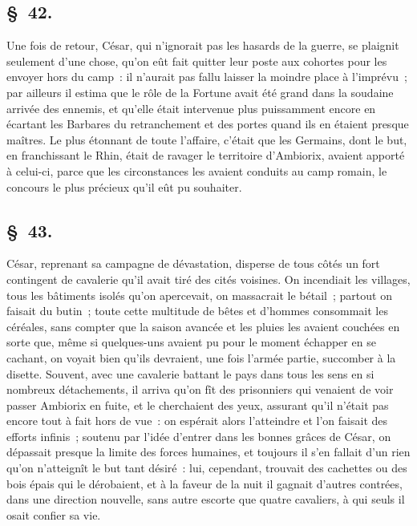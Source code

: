 \documentclass[french,twoside]{book} %
\begin{document}
\subsection[{§ 42.}]{ \textsc{§ 42.} }
\noindent Une fois de retour, César, qui n’ignorait pas les hasards de la guerre, se plaignit seulement d’une chose, qu’on eût fait quitter leur poste aux cohortes pour les envoyer hors du camp : il n’aurait pas fallu laisser la moindre place à l’imprévu ; par ailleurs il estima que le rôle de la Fortune avait été grand dans la soudaine arrivée des ennemis, et qu’elle était intervenue plus puissamment encore en écartant les Barbares du retranchement et des portes quand ils en étaient presque maîtres. Le plus étonnant de toute l’affaire, c’était que les Germains, dont le but, en franchissant le Rhin, était de ravager le territoire d’Ambiorix, avaient apporté à celui-ci, parce que les circonstances les avaient conduits au camp romain, le concours le plus précieux qu’il eût pu souhaiter.
\subsection[{§ 43.}]{ \textsc{§ 43.} }
\noindent César, reprenant sa campagne de dévastation, disperse de tous côtés un fort contingent de cavalerie qu’il avait tiré des cités voisines. On incendiait les villages, tous les bâtiments isolés qu’on apercevait, on massacrait le bétail ; partout on faisait du butin ; toute cette multitude de bêtes et d’hommes consommait les céréales, sans compter que la saison avancée et les pluies les avaient couchées en sorte que, même si quelques-uns avaient pu pour le moment échapper en se cachant, on voyait bien qu’ils devraient, une fois l’armée partie, succomber à la disette. Souvent, avec une cavalerie battant le pays dans tous les sens en si nombreux détachements, il arriva qu’on fît des prisonniers qui venaient de voir passer Ambiorix en fuite, et le cherchaient des yeux, assurant qu’il n’était pas encore tout à fait hors de vue : on espérait alors l’atteindre et l’on faisait des efforts infinis ; soutenu par l’idée d’entrer dans les bonnes grâces de César, on dépassait presque la limite des forces humaines, et toujours il s’en fallait d’un rien qu’on n’atteignît le but tant désiré : lui, cependant, trouvait des cachettes ou des bois épais qui le dérobaient, et à la faveur de la nuit il gagnait d’autres contrées, dans une direction nouvelle, sans autre escorte que quatre cavaliers, à qui seuls il osait confier sa vie.
\end{document}
